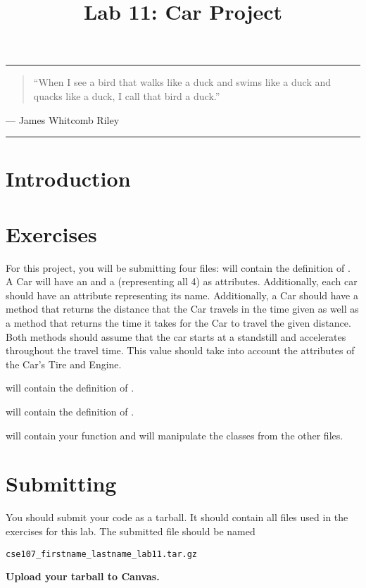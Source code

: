 \documentclass[11pt]{cselabheader}
\title{Lab 11: Car Project}
\begin{document}
\maketitle

\hrule
\begin{quotation}
  ``When I see a bird that walks like a duck and swims like a duck and quacks like
  a duck, I call that bird a duck.''
\end{quotation}
\begin{flushright}
  --- James Whitcomb Riley
\end{flushright}

\hrule

\section{Introduction}


\clearpage
\section{Exercises}
\label{sec:ex}

\begin{ex}
  For this project, you will be submitting four files:
   will contain the definition of . A
  Car will have an  and a   (representing all 4)
  as attributes. Additionally, each car should have an attribute representing its name.
  Additionally, a Car should have a method  that returns
  the distance that the Car travels in the time given as well as a method
   that returns the time it takes for the Car to travel
  the given distance.
  Both methods should assume that
  the car starts at a standstill and accelerates throughout the travel time. This value
  should take into account the attributes of the Car's Tire and Engine.
  
   will contain the definition of .
  
   will contain the definition of .

   will contain your  function and will
  manipulate the classes from the other files.
\end{ex}

\pagebreak
\section{Submitting}
You should submit your code as a tarball. It should contain all files
used in the exercises for this lab. The submitted file should be named
\begin{center}
  \texttt{cse107\_firstname\_lastname\_lab11.tar.gz}
\end{center}

\begin{center}
  \textbf{Upload your tarball to Canvas.}
\end{center}

\listoftheorems
\end{document}
